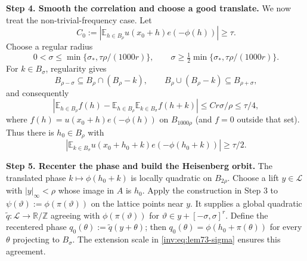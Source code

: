 \documentclass[twoside]{aomart}
\makeatletter
\theoremstyle{paperplain}
\theoremstyle{paperdefinition}
\renewenvironment{proof}[1][\proofname]{\par\pushQED{\qed}%
  \normalfont\topsep6\p@\@plus3\p@\relax\trivlist
  \item[\hskip\labelsep\itshape #1\@addpunct{.}]\ignorespaces
}{\popQED\endtrivlist\@endpefalse}
\numberwithin{equation}{section}
\makeatother
\begin{document}
\begin{proof}
\par
\medskip
\noindent\textbf{Step 4. Smooth the correlation and choose a good translate.}
We now treat the non-trivial-frequency case.  Let
\[
 C_0:=\left|\mathbb E_{h\in B_\rho}u(x_0+h)e(-\phi(h))\right|\ge\tau .
\]
Choose a regular radius
\begin{equation}
 0<\sigma\le\min\{\sigma_*,\tau\rho/(1000r)\},\qquad
 \sigma\ge\tfrac12\min\{\sigma_*,\tau\rho/(1000r)\}.              \label{inv:eq:lem73-sigma}
\end{equation}
For $k\in B_\sigma$, regularity gives
\[
 B_{\rho-\sigma}\subseteq B_\rho\cap(B_\rho-k),\qquad
 B_\rho\cup(B_\rho-k)\subseteq B_{\rho+\sigma},
\]
and consequently
\begin{equation*}
 \left|\mathbb E_{h\in B_\rho}f(h)-
 \mathbb E_{h\in B_\rho}\mathbb E_{k\in B_\sigma}f(h+k)\right|
 \le C r\sigma/\rho\le\tau/4,                                    
\end{equation*}
where $f(h)=u(x_0+h)e(-\phi(h))$ on $B_{1000\rho}$ (and $f=0$ outside
that set).  Thus there is $h_0\in B_\rho$ with
\begin{equation}
 \left|\mathbb E_{k\in B_\sigma}u(x_0+h_0+k)e(-\phi(h_0+k))\right|
 \ge\tau/2.                                                        \label{inv:eq:lem73-good-translate}
\end{equation}
\par
\medskip
\noindent\textbf{Step 5. Recenter the phase and build the Heisenberg orbit.}
The translated phase $k\mapsto\phi(h_0+k)$ is locally quadratic on
$B_{2\rho}$. Choose a lift $y\in\mathcal L$ with $|y|_\infty<\rho$ whose
image in $A$ is $h_0$. Apply the construction in Step 3 to
$\psi(\vartheta):=\phi(\pi(\vartheta))$ on the lattice points near $y$.
It supplies a global quadratic
$\widetilde q:\mathcal L\to\mathbb R/\mathbb Z$ agreeing with
$\phi(\pi(\vartheta))$ for $\vartheta\in y+[-\sigma,\sigma]^r$.
Define the recentered phase
$q_0(\theta):=\widetilde q(y+\theta)$; then
$q_0(\theta)=\phi(h_0+\pi(\theta))$ for every $\theta$ projecting to
$B_\sigma$. The extension scale in \eqref{inv:eq:lem73-sigma} ensures this agreement.


\end{proof}
\end{document}
